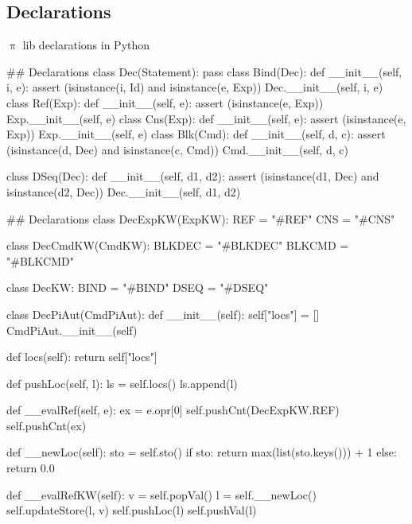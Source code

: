 \documentclass{beamer}
\begin{document}
\subsection{Declarations}
\begin{frame}{{\color{red}$\uppi$ lib} declarations in Python}


\begin{python}
## Declarations
class Dec(Statement): pass
class Bind(Dec):
   def __init__(self, i, e):
       assert (isinstance(i, Id) and isinstance(e, Exp))
       Dec.__init__(self, i, e)
class Ref(Exp):
   def __init__(self, e):
       assert (isinstance(e, Exp))
       Exp.__init__(self, e)
class Cns(Exp):
   def __init__(self, e):
       assert (isinstance(e, Exp))
       Exp.__init__(self, e)       
class Blk(Cmd):
   def __init__(self, d, c):
       assert (isinstance(d, Dec) and isinstance(c, Cmd))
       Cmd.__init__(self, d, c)
\end{python}
\framebreak
\begin{python}
class DSeq(Dec):
   def __init__(self, d1, d2):
       assert (isinstance(d1, Dec) and isinstance(d2, Dec))
       Dec.__init__(self, d1, d2)
\end{python}

\framebreak

\begin{python}
## Declarations
class DecExpKW(ExpKW):
   REF = "#REF"
   CNS = "#CNS"

class DecCmdKW(CmdKW):
   BLKDEC = "#BLKDEC"
   BLKCMD = "#BLKCMD"

class DecKW:
   BIND = "#BIND"
   DSEQ = "#DSEQ"

class DecPiAut(CmdPiAut):
   def __init__(self):
       self["locs"] = []
       CmdPiAut.__init__(self)

   def locs(self):
       return self["locs"]

   def pushLoc(self, l):
       ls = self.locs()
       ls.append(l)

   def __evalRef(self, e):
       ex = e.opr[0]
       self.pushCnt(DecExpKW.REF)
       self.pushCnt(ex)

   def __newLoc(self):
       sto = self.sto()
       if sto:
           return max(list(sto.keys())) + 1
       else:
           return 0.0

   def __evalRefKW(self):
       v = self.popVal()
       l = self.__newLoc()
       self.updateStore(l, v)
       self.pushLoc(l)
       self.pushVal(l)


\end{python}
\end{frame}
\end{document}
